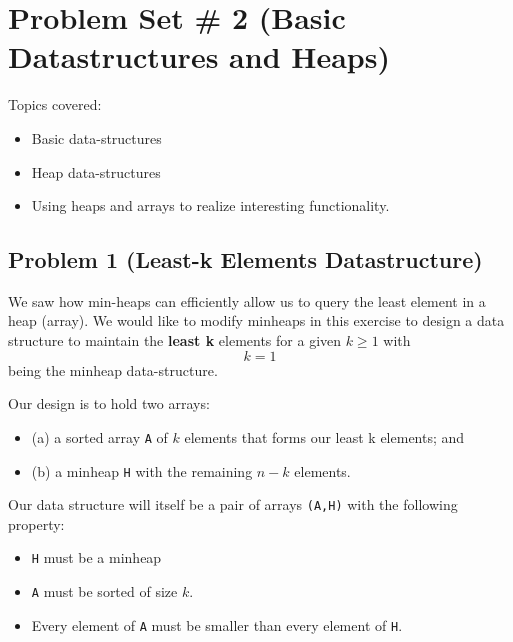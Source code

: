 \documentclass[
]{article}
\author{}
\date{}
\providecommand{\tightlist}{%
  \setlength{\itemsep}{0pt}\setlength{\parskip}{0pt}}
\begin{document}
\hypertarget{problem-set--2-basic-datastructures-and-heaps}{%
\section{Problem Set \# 2 (Basic Datastructures and
Heaps)}\label{problem-set--2-basic-datastructures-and-heaps}}

Topics covered:

\begin{itemize}
\tightlist
\item
  Basic data-structures
\item
  Heap data-structures
\item
  Using heaps and arrays to realize interesting functionality.
\end{itemize}

\hypertarget{problem-1-least-k-elements-datastructure}{%
\subsection{Problem 1 (Least-k Elements
Datastructure)}\label{problem-1-least-k-elements-datastructure}}

We saw how min-heaps can efficiently allow us to query the least element
in a heap (array). We would like to modify minheaps in this exercise to
design a data structure to maintain the \textbf{least k} elements for a
given \(k \geq 1\) with \[k = 1\] being the minheap data-structure.

Our design is to hold two arrays:

\begin{itemize}
\tightlist
\item
  (a) a sorted array \texttt{A} of \(k\) elements that forms our least k
  elements; and
\item
  (b) a minheap \texttt{H} with the remaining \(n-k\) elements.
\end{itemize}

Our data structure will itself be a pair of arrays \texttt{(A,H)} with
the following property:

\begin{itemize}
\tightlist
\item
  \texttt{H} must be a minheap
\item
  \texttt{A} must be sorted of size \(k\).
\item
  Every element of \texttt{A} must be smaller than every element of
  \texttt{H}.
\end{itemize}
\end{document}
